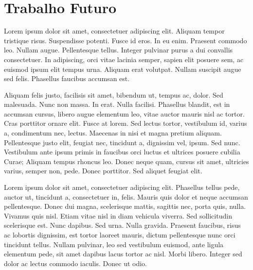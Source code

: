 \section{Trabalho Futuro}

Lorem ipsum dolor sit amet, consectetuer adipiscing elit. Aliquam
tempor tristique risus. Suspendisse potenti. Fusce id eros. In eu
enim. Praesent commodo leo. Nullam augue. Pellentesque tellus. Integer
pulvinar purus a dui convallis consectetuer. In adipiscing, orci vitae
lacinia semper, sapien elit posuere sem, ac euismod ipsum elit tempus
urna. Aliquam erat volutpat. Nullam suscipit augue sed
felis. Phasellus faucibus accumsan est. 

Aliquam felis justo, facilisis sit amet, bibendum ut, tempus ac,
dolor. Sed malesuada. Nunc non massa. In erat. Nulla
facilisi. Phasellus blandit, est in accumsan cursus, libero augue
elementum leo, vitae auctor mauris nisl ac tortor. Cras porttitor
ornare elit. Fusce at lorem. Sed lectus tortor, vestibulum id, varius
a, condimentum nec, lectus. Maecenas in nisi et magna pretium
aliquam. Pellentesque justo elit, feugiat nec, tincidunt a, dignissim
vel, ipsum. Sed nunc. Vestibulum ante ipsum primis in faucibus orci
luctus et ultrices posuere cubilia Curae; Aliquam tempus rhoncus
leo. Donec neque quam, cursus sit amet, ultricies varius, semper non,
pede. Donec porttitor. Sed aliquet feugiat elit.  

\vspace*{12mm}

Lorem ipsum dolor sit amet, consectetuer adipiscing elit. Phasellus
tellus pede, auctor ut, tincidunt a, consectetuer in, felis. Mauris
quis dolor et neque accumsan pellentesque. Donec dui magna,
scelerisque mattis, sagittis nec, porta quis, nulla. Vivamus quis
nisl. Etiam vitae nisl in diam vehicula viverra. Sed sollicitudin
scelerisque est. Nunc dapibus. Sed urna. Nulla gravida. Praesent
faucibus, risus ac lobortis dignissim, est tortor laoreet mauris,
dictum pellentesque nunc orci tincidunt tellus. Nullam pulvinar, leo
sed vestibulum euismod, ante ligula elementum pede, sit amet dapibus
lacus tortor ac nisl. Morbi libero. Integer sed dolor ac lectus
commodo iaculis. Donec ut odio.  
